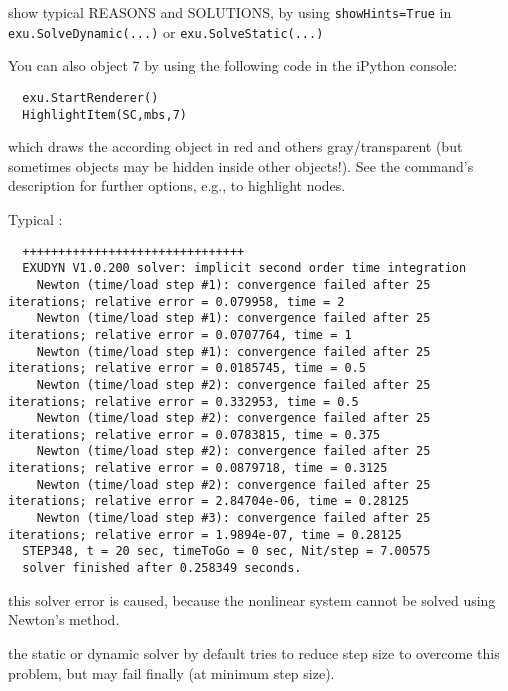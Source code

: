 \item[$\ra$] show typical REASONS and SOLUTIONS, by using \texttt{showHints=True} in \texttt{exu.SolveDynamic(...)} or \texttt{exu.SolveStatic(...)}
\item[$\ra$] You can also  object 7 by using the following code in the iPython console:
\ei
\pythonstyle\begin{lstlisting}
  exu.StartRenderer()
  HighlightItem(SC,mbs,7)
\end{lstlisting}
%
which draws the according object in red and others gray/transparent (but sometimes objects may be hidden inside other objects!). See the command's description for further options, e.g., to highlight nodes.
\vspace{12pt}\\
\item Typical :
\plainlststyle
\begin{lstlisting}
  +++++++++++++++++++++++++++++++
  EXUDYN V1.0.200 solver: implicit second order time integration
    Newton (time/load step #1): convergence failed after 25 iterations; relative error = 0.079958, time = 2
    Newton (time/load step #1): convergence failed after 25 iterations; relative error = 0.0707764, time = 1
    Newton (time/load step #1): convergence failed after 25 iterations; relative error = 0.0185745, time = 0.5
    Newton (time/load step #2): convergence failed after 25 iterations; relative error = 0.332953, time = 0.5
    Newton (time/load step #2): convergence failed after 25 iterations; relative error = 0.0783815, time = 0.375
    Newton (time/load step #2): convergence failed after 25 iterations; relative error = 0.0879718, time = 0.3125
    Newton (time/load step #2): convergence failed after 25 iterations; relative error = 2.84704e-06, time = 0.28125
    Newton (time/load step #3): convergence failed after 25 iterations; relative error = 1.9894e-07, time = 0.28125
  STEP348, t = 20 sec, timeToGo = 0 sec, Nit/step = 7.00575
  solver finished after 0.258349 seconds.
\end{lstlisting}
%
\bi
\item[$\ra$] this solver error is caused, because the nonlinear system cannot be solved using Newton's method.
\item[$\ra$] the static or dynamic solver by default tries to reduce step size to overcome this problem, but may fail finally (at minimum step size).

